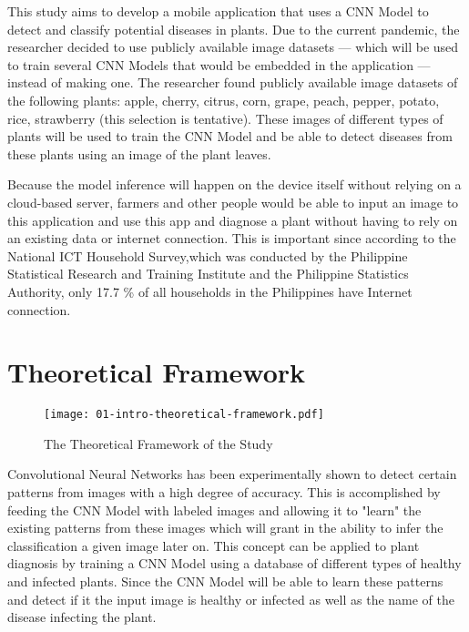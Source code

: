 \bigskip


This study aims to develop a mobile application that uses a 
CNN Model  to detect and classify potential diseases in 
plants. Due to the current pandemic, the researcher decided to use publicly 
available image datasets — which will be used to train several CNN Models 
that would be embedded in the application — instead of making one. The researcher 
found publicly available image datasets of the following plants:
apple, cherry, citrus, corn, grape, peach, pepper, potato,
rice, strawberry (this selection is tentative). These images of different types 
of plants will be used to train the CNN Model and be able to detect diseases from 
these plants using an image of the plant leaves.  

\bigskip

Because the model inference will
happen on the device itself without relying on a cloud-based server, 
farmers and other people would be able to input an image to this application 
and use this app and diagnose a plant without having to rely on an 
existing data or internet connection. This is important since according to 
the  National ICT Household Survey,which was conducted by the Philippine Statistical 
Research and Training Institute and the Philippine Statistics Authority, only 
17.7 \% of all households in the Philippines have Internet connection. 


\newpage 


\section{Theoretical Framework}

\begin{figure}[h!]
      \centering
      \texttt{[image: 01-intro-theoretical-framework.pdf]}
      \caption{The Theoretical Framework of the Study}
\end{figure}

Convolutional Neural Networks has been experimentally shown 
to detect certain patterns from images with a high degree of 
accuracy. This is accomplished 
by feeding the CNN Model with labeled images and allowing it to "learn"
the existing patterns from these images which will grant in the ability 
to infer the classification a given image later on. This concept 
can be applied to plant diagnosis by training a CNN Model using a database 
of different types of healthy and infected plants. Since the CNN Model 
will be able to learn these patterns and detect if it the input image is 
healthy or infected as well as the name of the disease infecting the plant. 

